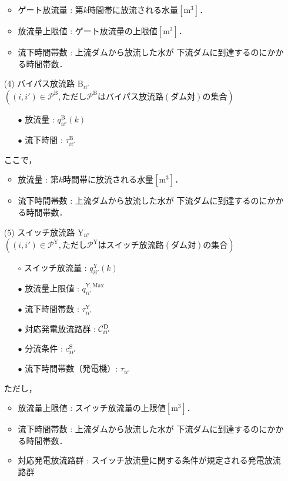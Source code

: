 \begin{itemize}
\begin{itemize}
		\item ゲート放流量 : 第$k$時間帯に放流される水量$[\mathrm m^{3}]$．
		\item 放流量上限値 : ゲート放流量の上限値$[\mathrm m^{3}]$．
		\item 流下時間帯数 : 上流ダムから放流した水が%
			下流ダムに到達するのにかかる時間帯数．
	\end{itemize}
%
\item[(4)]
	バイパス放流路 $\mathrm{B}_{ii'}$ $ ( (i,i') \in \mathcal{P}^{\mathrm B} , %
	ただし \mathcal {P}^{\mathrm B} はバイパス放流路(ダム対)の集合) $
%
	\begin{itemize}
		\item[$\bullet$]
			放流量 : $q^{\mathrm {B}}_{ii'}(k)$
		\item[$\bullet$]
			流下時間 : $\tau_{ii'}^{ \mathrm{B} }$
	\end{itemize}
	ここで，
	\begin{itemize}
		\item 放流量 : 第$k$時間帯に放流される水量$[\mathrm m^3]$．
		\item 流下時間帯数 : 上流ダムから放流した水が%
			下流ダムに到達するのにかかる時間帯数．
	\end{itemize}
%
\item[(5)]
	スイッチ放流路 $ \mathrm{Y}_{ii'}$ $ ( (i,i') \in \mathcal{P}^{\mathrm Y} , %
	ただし \mathcal {P}^{\mathrm Y} はスイッチ放流路(ダム対)の集合) $
%
	\begin{itemize}
		\item[$ \circ$]
			スイッチ放流量 : $q^{\mathrm {Y}}_{ii'}(k)$
		\item[$ \bullet$]
			放流量上限値 : $q^{\mathrm {Y,Max}}_{ii'}$
		\item[$ \bullet$]
			流下時間帯数 : $ \tau_{ii'}^{\mathrm Y}$
		\item[$ \bullet$]	
			対応発電放流路群 : $ \mathcal C_{ii'}^{\rm D}$
		\item[$ \bullet$]	
			分流条件 : $ c_{ii'}^{\rm S}$
		\item[$ \bullet$]
			流下時間帯数（発電機）: $\tau_{ii'}$
	\end{itemize}
	ただし，
	\begin{itemize}
		\item 放流量上限値 : スイッチ放流量の上限値$[\mathrm m^3]$．
		\item 流下時間帯数 : 上流ダムから放流した水が%
			下流ダムに到達するのにかかる時間帯数．
		\item 対応発電放流路群 : スイッチ放流量に関する条件が規定される発電放流路群

\end{itemize}
\end{itemize}
